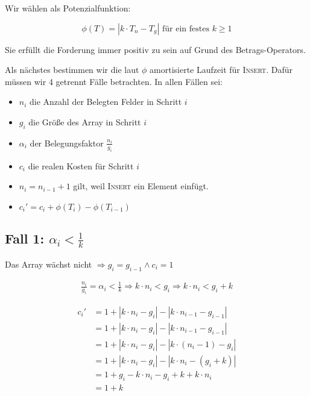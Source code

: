 \documentclass[parskip=half,a4paper]{scrartcl}
\begin{document}
Wir wählen als Potenzialfunktion:

\begin{equation}
    \phi(T) = \left|k \cdot T_n - T_g\right| \text{ für ein festes $k \ge 1$}
\end{equation}

Sie erfüllt die Forderung immer positiv zu sein auf Grund des Betrags-Operators.

Als nächstes bestimmen wir die laut $\phi$ amortisierte Laufzeit für \textsc{Insert}. Dafür müssen wir 4 getrennt Fälle betrachten. In allen Fällen sei:

\begin{itemize}
    \item $n_i$ die Anzahl der Belegten Felder in Schritt $i$
    \item $g_i$ die Größe des Array in Schritt $i$
    \item $\alpha_i$ der Belegungsfaktor $\frac{n_i}{g_i}$
    \item $c_i$ die realen Kosten für Schritt $i$
    \item $n_i = n_{i-1} + 1$ gilt, weil \textsc{Insert} ein Element einfügt.
    \item $c_i' = c_i + \phi(T_i) - \phi(T_{i-1})$
\end{itemize}

\subsection*{Fall 1: $\alpha_i < \frac{1}{k}$}

Das Array wächst nicht
$\Rightarrow g_i = g_{i-1} \land c_i = 1$

\begin{equation}
\begin{aligned}
\frac{n_i}{g_i} = \alpha_i < \frac{1}{k}
\Rightarrow k \cdot n_i < g_i
\Rightarrow  k \cdot n_i < g_i + k
\end{aligned}
\end{equation}

\begin{equation}
\begin{aligned}
   c_i' &= 1 + \left|k \cdot n_i - g_i\right| - \left|k \cdot n_{i-1} - g_{i-1}\right|\\
   &= 1 + \left|k \cdot n_i - g_i\right| - \left|k \cdot n_{i-1} - g_{i-1}\right|\\
   &= 1 + \left|k \cdot n_i - g_i\right| - \left|k \cdot  (n_{i}-1) - g_{i}\right|\\
   &= 1 + \left|k \cdot n_i - g_i\right| - \left|k \cdot n_{i} - (g_{i} + k)\right|\\
   &= 1 + g_i - k \cdot n_i - g_i + k + k \cdot n_i\\
   &= 1 + k
\end{aligned}
\end{equation}
\end{document}
